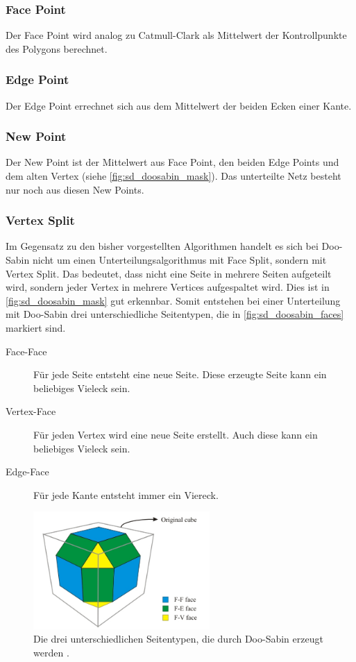 \subsubsection*{Face Point}
Der Face Point wird analog zu Catmull-Clark als Mittelwert der Kontrollpunkte des Polygons
berechnet.

\subsubsection*{Edge Point}
Der Edge Point errechnet sich aus dem Mittelwert der beiden Ecken einer Kante.

\subsubsection*{New Point}
Der New Point ist der Mittelwert aus Face Point, den beiden Edge Points und dem alten Vertex
(siehe \autoref{fig:sd_doosabin_mask}). Das unterteilte Netz besteht nur noch aus diesen New Points.

\subsubsection*{Vertex Split}
Im Gegensatz zu den bisher vorgestellten Algorithmen handelt es sich bei Doo-Sabin nicht um einen
Unterteilungsalgorithmus mit Face Split, sondern mit Vertex Split.
Das bedeutet, dass nicht eine Seite in mehrere Seiten aufgeteilt wird, sondern
jeder Vertex in mehrere Vertices aufgespaltet wird.
Dies ist in \autoref{fig:sd_doosabin_mask} gut erkennbar.
Somit entstehen bei einer Unterteilung mit Doo-Sabin drei unterschiedliche Seitentypen,
die in \autoref{fig:sd_doosabin_faces} markiert sind.
\begin{description}
 \item[Face-Face] Für jede Seite entsteht eine neue Seite.
 Diese erzeugte Seite kann ein beliebiges Vieleck sein.
 \item[Vertex-Face] Für jeden Vertex wird eine neue Seite erstellt.
 Auch diese kann ein beliebiges Vieleck sein.
 \item[Edge-Face] Für jede Kante entsteht immer ein Viereck.
\end{description}
\cite{Yoshihitoyagi.doosabin} \cite{UniCalifornia} \cite{Olsen}

\begin{figure}
\centering
\includegraphics[width=0.6\textwidth]{content/media/sd_doosabin_face_types.jpg}
\caption{Die drei unterschiedlichen Seitentypen, die durch Doo-Sabin erzeugt werden \cite{Olsen}.}
\label{fig:sd_doosabin_faces}
\end{figure}


